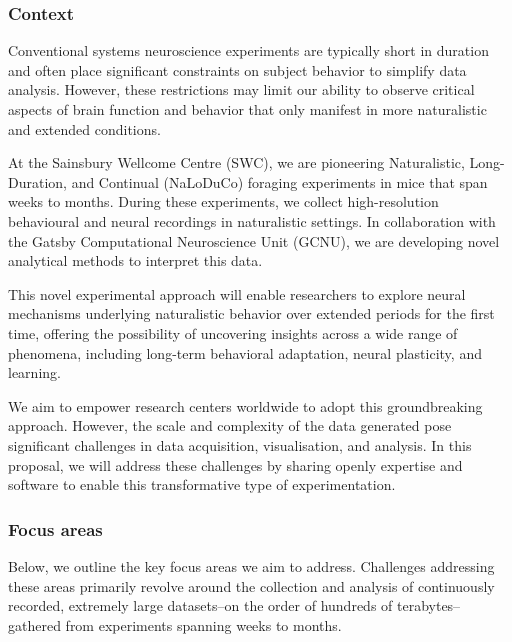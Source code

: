 \subsubsection{Context}

Conventional systems neuroscience experiments are typically short in duration
and often place significant constraints on subject behavior to simplify data
analysis.
%
However, these restrictions may limit our ability to observe critical
aspects of brain function and behavior that only manifest in more naturalistic
and extended conditions.

At the Sainsbury Wellcome Centre (SWC), we are pioneering Naturalistic,
Long-Duration, and Continual (NaLoDuCo) foraging experiments in mice that span
weeks to months. During these experiments, we collect high-resolution
behavioural and neural recordings in naturalistic settings. In collaboration
with the Gatsby Computational Neuroscience Unit (GCNU), we are developing novel
analytical methods to interpret this data.

This novel experimental approach will enable researchers to explore neural
mechanisms underlying naturalistic behavior over extended periods for the first
time, offering the possibility of uncovering insights across a wide range of
phenomena, including long-term behavioral adaptation, neural plasticity, and
learning.
%

We aim to empower research centers worldwide to adopt this
groundbreaking approach.
%
However, the scale and complexity of the data generated pose significant
challenges in data acquisition, visualisation, and analysis.
%
In this proposal, we will address these challenges by sharing openly expertise
and software to enable this transformative type of experimentation.

\subsubsection{Focus areas}

Below, we outline the key focus areas we aim to address.
%
Challenges addressing these areas primarily revolve around the collection
and analysis of continuously recorded, extremely large datasets--on the order
of hundreds of terabytes--gathered from experiments spanning weeks to months.

